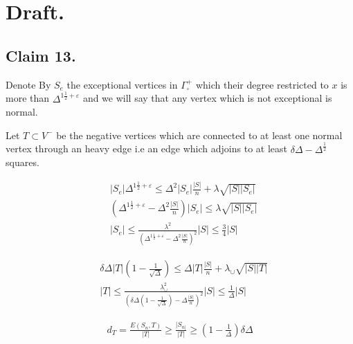\section{Draft.} 

\subsection{Claim 13.}

Denote By $S_{e}$ the exceptional vertices in $\Gamma^{+}_{\square}$ which their degree restricted to $x$ is more than $\Delta^{1 \frac{1}{2} + \varepsilon}$ and we will say that any vertex which is not exceptional is normal.  

Let $T \subset V^{-}$ be the negative vertices which are connected to at least one normal vertex through an heavy edge i.e an edge which adjoins to at least $\delta\Delta - \Delta^{\frac{1}{2}}$ squares. 


\begin{equation*}
  \begin{split}
    & |S_{e}|\Delta^{1 \frac{1}{2}+ \varepsilon} \le \Delta^{2}|S_{e}|\frac{|S|}{n} +  \lambda \sqrt{|S||S_{e}|} \\ 
    & \left(  \Delta^{1 \frac{1}{2}+ \varepsilon} - \Delta^{2} \frac{|S|}{n}\right)|S_{e}| \le  \lambda \sqrt{|S||S_{e}|}\\
    & |S_{e}| \le \frac{\lambda^{2}}{\left(  \Delta^{1 \frac{1}{2}+ \varepsilon} - \Delta^{2} \frac{|S|}{n} \right)^{2}} |S| \le \frac{3}{4} |S|
  \end{split}
\end{equation*}


\begin{equation*}
  \begin{split}
    & \delta\Delta|T|\left( 1 - \frac{1}{\sqrt{\Delta}} \right) \le \Delta |T| \frac{|S|}{n} + \lambda_{\cup} \sqrt{|S||T|}\\ 
    & |T| \le \frac{\lambda_{\cup}^{2}}{ \left( \delta \Delta \left( 1 - \frac{1}{\sqrt{\Delta}} \right) -  \Delta \frac{|S|}{n} \right)^{2} } |S| \le \frac{1}{\Delta}|S|
  \end{split}
\end{equation*}


\begin{equation*}
  \begin{split}
    d_{T} = \frac{E(S_{n}, T)}{|T|} \ge \frac{|S_{n|}}{|T|} \ge   \left( 1 -  \frac{1}{\Delta} \right) \delta\Delta
  \end{split}
\end{equation*}


